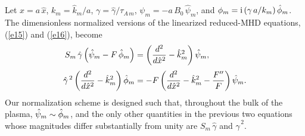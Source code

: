 \documentclass[12pt,prb,aps]{revtex4-1}
\begin{document}
Let $x=a\,\hat{x}$, $k_m = \hat{k}_m/a$, $\gamma=\hat{\gamma}/\tau_{A\,m}$, $\psi_m = -a\,B_0\,\hat{\psi}_m$,
and $\phi_m= {\rm i}\,(\gamma\,a/k_m)\,\skew{3}\hat{\phi}_m$. The dimensionless normalized versions of the
linearized reduced-MHD equations, (\ref{e15}) and (\ref{e16}),  become
\begin{align}
S_m\,\hat{\gamma}\left(\hat{\psi}_m-F\,\skew{3}\hat{\phi}_m\right)&= \left(\frac{d^2}{d\hat{x}^2}-\hat{k}_m^2\right)\hat{\psi}_m,\label{e9.27}\\[0.5ex]
\hat{\gamma}^{\,2}\left(\frac{d^2}{d\hat{x}^2}-\hat{k}_m^2\right)\skew{3}\hat{\phi}_m&= - F\left(\frac{d^2}{d\hat{x}^2}
-\hat{k}_m^2-\frac{F''}{F}\right)\hat{\psi}_m.\label{e9.28}
\end{align}
 Our normalization scheme is designed such that, throughout the
bulk of the plasma, $\hat{\psi}_m\sim \skew{3}\hat{\phi}_m$, and the only other quantities in the previous two equations whose magnitudes differ substantially
from unity are $S_m\,\hat{\gamma}$ and $\hat{\gamma}^{\,2}$. 
\end{document}
